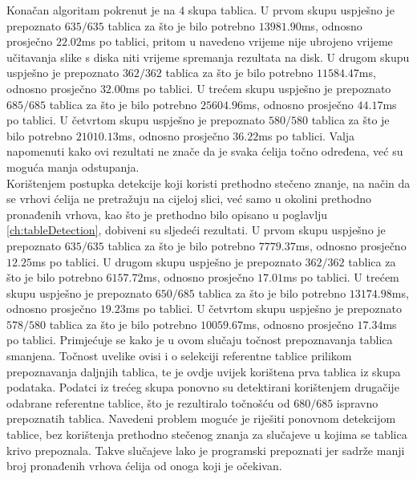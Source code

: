 \documentclass[times, utf8, zavrsni, numeric]{fer}
\begin{document}
Konačan algoritam pokrenut je na $4$ skupa tablica.
U prvom skupu uspješno je prepoznato $635/635$ tablica za što je bilo potrebno $13981.90$ms, odnosno prosječno $22.02$ms po tablici, pritom u navedeno vrijeme nije ubrojeno vrijeme učitavanja slike s diska niti vrijeme spremanja rezultata na disk.
U drugom skupu uspješno je prepoznato $362/362$ tablica za što je bilo potrebno $11584.47$ms, odnosno prosječno $32.00$ms po tablici.
U trećem skupu uspješno je prepoznato $685/685$ tablica za što je bilo potrebno $25604.96$ms, odnosno prosječno $44.17$ms po tablici.
U četvrtom skupu uspješno je prepoznato $580/580$ tablica za što je bilo potrebno $21010.13$ms, odnosno prosječno $36.22$ms po tablici.
Valja napomenuti kako ovi rezultati ne znače da je svaka ćelija točno određena, već su moguća manja odstupanja.\\

Korištenjem postupka detekcije koji koristi prethodno stečeno znanje, na način da se vrhovi ćelija ne pretražuju na cijeloj slici, već samo u okolini prethodno pronađenih vrhova, kao što je prethodno bilo opisano u poglavlju \ref{ch:tableDetection}, dobiveni su sljedeći rezultati.
U prvom skupu uspješno je prepoznato $635/635$ tablica za što je bilo potrebno $7779.37$ms, odnosno prosječno $12.25$ms po tablici.
U drugom skupu uspješno je prepoznato $362/362$ tablica za što je bilo potrebno $6157.72$ms, odnosno prosječno $17.01$ms po tablici.
U trećem skupu uspješno je prepoznato $650/685$ tablica za što je bilo potrebno $13174.98$ms, odnosno prosječno $19.23$ms po tablici.
U četvrtom skupu uspješno je prepoznato $578/580$ tablica za što je bilo potrebno $10059.67$ms, odnosno prosječno $17.34$ms po tablici.
Primjećuje se kako je u ovom slučaju točnost prepoznavanja tablica smanjena.
Točnost uvelike ovisi i o selekciji referentne tablice prilikom prepoznavanja daljnjih tablica, te je ovdje uvijek korištena prva tablica iz skupa podataka.
Podatci iz trećeg skupa ponovno su detektirani korištenjem drugačije odabrane referentne tablice, što je rezultiralo točnošću od $680/685$ ispravno prepoznatih tablica.
Navedeni problem moguće je riješiti ponovnom detekcijom tablice, bez korištenja prethodno stečenog znanja za slučajeve u kojima se tablica krivo prepoznala.
Takve slučajeve lako je programski prepoznati jer sadrže manji broj pronađenih vrhova ćelija od onoga koji je očekivan.\\
\end{document}
